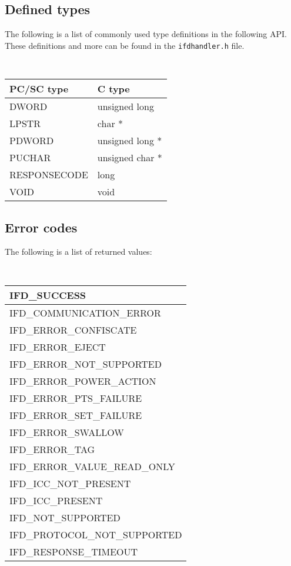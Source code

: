 \documentclass[a4paper,12pt]{article}
\begin{document}
\subsection{Defined types}

The following is a list of commonly used type definitions in the
following API. These definitions and more can be found in the
\texttt{ifdhandler.h} file.

{\tt
\begin{longtable}{|l|l|}
\hline
\textrm{PC/SC type} & \textrm{C type} \\
\hline
\hline
DWORD & unsigned long \\
LPSTR & char * \\
PDWORD & unsigned long * \\
PUCHAR & unsigned char * \\
RESPONSECODE & long \\
VOID & void \\
\hline
\end{longtable}
}


\subsection{Error codes}

The following is a list of returned values:

{\tt
\begin{longtable}{|l|}
\hline
IFD\_SUCCESS \\
\hline
IFD\_COMMUNICATION\_ERROR\\
IFD\_ERROR\_CONFISCATE\\
IFD\_ERROR\_EJECT\\
IFD\_ERROR\_NOT\_SUPPORTED\\
IFD\_ERROR\_POWER\_ACTION\\
IFD\_ERROR\_PTS\_FAILURE\\
IFD\_ERROR\_SET\_FAILURE\\
IFD\_ERROR\_SWALLOW\\
IFD\_ERROR\_TAG\\
IFD\_ERROR\_VALUE\_READ\_ONLY\\
IFD\_ICC\_NOT\_PRESENT\\
IFD\_ICC\_PRESENT\\
IFD\_NOT\_SUPPORTED\\
IFD\_PROTOCOL\_NOT\_SUPPORTED\\
IFD\_RESPONSE\_TIMEOUT\\
\hline
\end{longtable}
}
\end{document}
